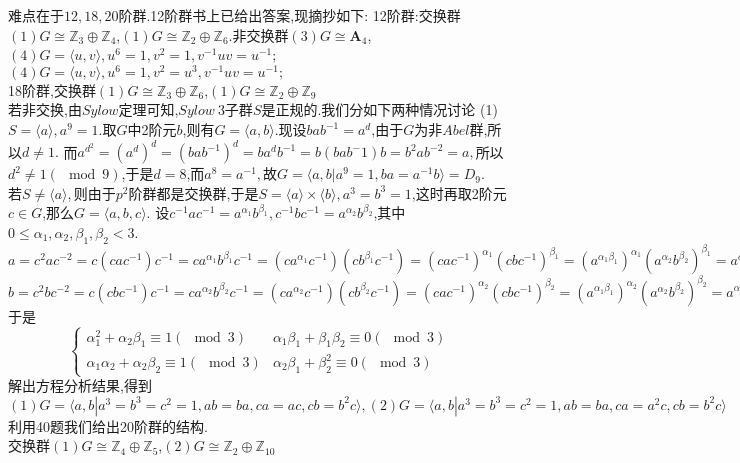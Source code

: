 \documentclass[b5paper]{ctexart}
\begin{document}
难点在于$12,18,20$阶群.12阶群书上已给出答案,现摘抄如下:
12阶群:交换群$(1)G\cong\mathbb{Z}_3\oplus\mathbb{Z}_4$,$(1)G\cong\mathbb{Z}_2\oplus\mathbb{Z}_6$.非交换群$(3)G\cong\mathbf{A}_4$,$(4)G=\langle u,v\rangle,u^6=1,v^2=1,v^{-1}uv=u^{-1}$;$(4)G=\langle u,v\rangle,u^6=1,v^2=u^3,v^{-1}uv=u^{-1};$\\
18阶群,交换群$(1)G\cong\mathbb{Z}_3\oplus\mathbb{Z}_6$,$(1)G\cong\mathbb{Z}_2\oplus\mathbb{Z}_9$\\
若非交换,由$Sylow$定理可知,$Sylow~$3子群$S$是正规的.我们分如下两种情况讨论
(1)$S=\langle a\rangle,a^9=1$.取$G$中2阶元$b$,则有$G=\langle a,b\rangle.$现设$bab^{-1}=a^d$,由于$G$为非$Abel$群,所以$d\neq 1.$
而$a^{d^2}=(a^d)^d=(bab^{-1})^d=ba^db^{-1}=b(bab^-1)b=b^2ab^{-2}=a,$所以$d^2\neq 1(\mod 9)$,于是$d=8$,而$a^8=a^{-1},$故$G=\langle a,b|a^9=1,ba=a^{-1}b\rangle=D_9.$\\
若$S\neq \langle a\rangle,$则由于$p^2$阶群都是交换群,于是$S=\langle a\rangle\times \langle b\rangle,a^3=b^3=1$,这时再取2阶元$c\in G$,那么$G=\langle a,b,c\rangle.$
设$c^{-1}ac^{-1}=a^{\alpha_1}b^{\beta_1},c^{-1}bc^{-1}=a^{\alpha_2}b^{\beta_2}$,其中$0\leq \alpha_1,\alpha_2,\beta_1,\beta_2<3$.\\
$a=c^2ac^{-2}=c(cac^{-1})c^{-1}=ca^{\alpha_1}b^{\beta_1}c^{-1}=(ca^{\alpha_1}c^{-1})(cb^{\beta_1}c^{-1})=(cac^{-1})^{\alpha_1}(cbc^{-1})^{\beta_1}=(a^{\alpha_1\beta_1})^{\alpha_1}(a^{\alpha_2}b^{\beta_2})^{\beta_1}=a^{\alpha_1^2+\alpha_2\beta_1}b^{\alpha_1\beta_1+\beta_1\beta_2}$\\
$b=c^2bc^{-2}=c(cbc^{-1})c^{-1}=ca^{\alpha_2}b^{\beta_2}c^{-1}=(ca^{\alpha_2}c^{-1})(cb^{\beta_2}c^{-1})=(cac^{-1})^{\alpha_2}(cbc^{-1})^{\beta_2}=(a^{\alpha_1\beta_1})^{\alpha_2}(a^{\alpha_2}b^{\beta_2})^{\beta_2}=a^{\alpha_1\alpha_2+\alpha_2\beta_2}b^{\alpha_2\beta_1+\beta_2^2}$\\
于是
\[\left\lbrace \begin{array}{rr}
\alpha_1^2+\alpha_2\beta_1\equiv1(\mod 3) &\alpha_1\beta_1+\beta_1\beta_2\equiv 0(\mod 3)\\
\alpha_1\alpha_2+\alpha_2\beta_2\equiv1(\mod 3)&\alpha_2\beta_1+\beta_2^2\equiv0(\mod 3)
\end{array}\right. \]
解出方程分析结果,得到\\
$(1)G=\langle a,b|a^3=b^3=c^2=1,ab=ba,ca=ac,cb=b^2c\rangle,(2)G=\langle a,b|a^3=b^3=c^2=1,ab=ba,ca=a^2c,cb=b^2c\rangle$\\
利用40题我们给出20阶群的结构.\\
交换群$(1)G\cong\mathbb{Z}_4\oplus\mathbb{Z}_5$,$(2)G\cong\mathbb{Z}_2\oplus\mathbb{Z}_{10}$\\
\end{document}
